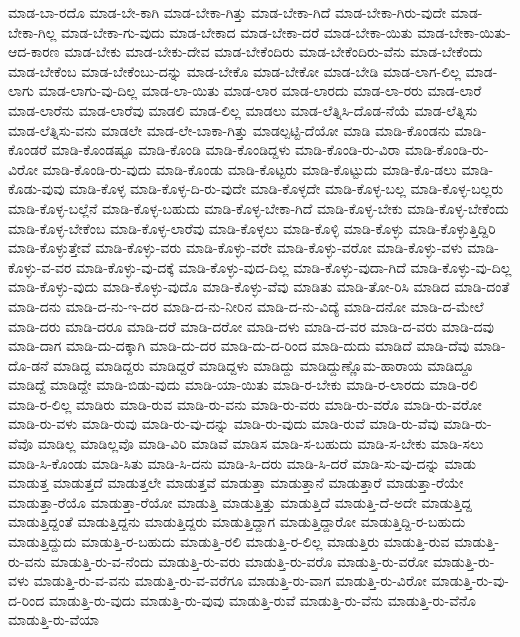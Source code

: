{ಮಾಡ-ಬಾ-ರದೊ
ಮಾಡ-ಬೇ-ಕಾಗಿ
ಮಾಡ-ಬೇಕಾ-ಗಿತ್ತು
ಮಾಡ-ಬೇಕಾ-ಗಿದೆ
ಮಾಡ-ಬೇಕಾ-ಗಿರು-ವುದೇ
ಮಾಡ-ಬೇಕಾ-ಗಿಲ್ಲ
ಮಾಡ-ಬೇಕಾ-ಗು-ವುದು
ಮಾಡ-ಬೇಕಾದ
ಮಾಡ-ಬೇಕಾ-ದರೆ
ಮಾಡ-ಬೇಕಾ-ಯಿತು
ಮಾಡ-ಬೇಕಾ-ಯಿತು-ಆದ-ಕಾರಣ
ಮಾಡ-ಬೇಕು
ಮಾಡ-ಬೇಕು-ದೇವ
ಮಾಡ-ಬೇಕೆಂದಿರು
ಮಾಡ-ಬೇಕೆಂದಿರು-ವೆನು
ಮಾಡ-ಬೇಕೆಂದು
ಮಾಡ-ಬೇಕೆಂಬ
ಮಾಡ-ಬೇಕೆಂಬು-ದನ್ನು
ಮಾಡ-ಬೇಕೊ
ಮಾಡ-ಬೇಕೋ
ಮಾಡ-ಬೇಡಿ
ಮಾಡ-ಲಾಗ-ಲಿಲ್ಲ
ಮಾಡ-ಲಾಗು
ಮಾಡ-ಲಾಗು-ವು-ದಿಲ್ಲ
ಮಾಡ-ಲಾ-ಯಿತು
ಮಾಡ-ಲಾರ
ಮಾಡ-ಲಾರದು
ಮಾಡ-ಲಾ-ರರು
ಮಾಡ-ಲಾರೆ
ಮಾಡ-ಲಾರೆನು
ಮಾಡ-ಲಾರೆವು
ಮಾಡಲಿ
ಮಾಡ-ಲಿಲ್ಲ
ಮಾಡಲು
ಮಾಡ-ಲೆತ್ನಿಸಿ-ದೊಡ-ನೆಯೆ
ಮಾಡ-ಲೆತ್ನಿಸು
ಮಾಡ-ಲೆತ್ನಿಸು-ವನು
ಮಾಡಲೇ
ಮಾಡ-ಲೇ-ಬಾಕಾ-ಗಿತ್ತು
ಮಾಡಲ್ಪಟ್ಟಿ-ದೆಯೋ
ಮಾಡಿ
ಮಾಡಿ-ಕೊಂಡನು
ಮಾಡಿ-ಕೊಂಡರೆ
ಮಾಡಿ-ಕೊಂಡಷ್ಟೂ
ಮಾಡಿ-ಕೊಂಡಿ
ಮಾಡಿ-ಕೊಂಡಿದ್ದಳು
ಮಾಡಿ-ಕೊಂಡಿ-ರು-ವಿರಾ
ಮಾಡಿ-ಕೊಂಡಿ-ರು-ವಿರೋ
ಮಾಡಿ-ಕೊಂಡಿ-ರು-ವುದು
ಮಾಡಿ-ಕೊಂಡು
ಮಾಡಿ-ಕೊಟ್ಟರು
ಮಾಡಿ-ಕೊಟ್ಟುದು
ಮಾಡಿ-ಕೊ-ಡಲು
ಮಾಡಿ-ಕೊಡು-ವುವು
ಮಾಡಿ-ಕೊಳ್ಳ
ಮಾಡಿ-ಕೊಳ್ಳ-ದಿ-ರು-ವುದೇ
ಮಾಡಿ-ಕೊಳ್ಳದೇ
ಮಾಡಿ-ಕೊಳ್ಳ-ಬಲ್ಲ
ಮಾಡಿ-ಕೊಳ್ಳ-ಬಲ್ಲರು
ಮಾಡಿ-ಕೊಳ್ಳ-ಬಲ್ಲೆನೆ
ಮಾಡಿ-ಕೊಳ್ಳ-ಬಹುದು
ಮಾಡಿ-ಕೊಳ್ಳ-ಬೇಕಾ-ಗಿದೆ
ಮಾಡಿ-ಕೊಳ್ಳ-ಬೇಕು
ಮಾಡಿ-ಕೊಳ್ಳ-ಬೇಕೆಂದು
ಮಾಡಿ-ಕೊಳ್ಳ-ಬೇಕೆಂಬ
ಮಾಡಿ-ಕೊಳ್ಳ-ಲಾರೆವು
ಮಾಡಿ-ಕೊಳ್ಳಲು
ಮಾಡಿ-ಕೊಳ್ಳಿ
ಮಾಡಿ-ಕೊಳ್ಳು
ಮಾಡಿ-ಕೊಳ್ಳುತ್ತಿದ್ದಿರಿ
ಮಾಡಿ-ಕೊಳ್ಳುತ್ತೇವೆ
ಮಾಡಿ-ಕೊಳ್ಳು-ವರು
ಮಾಡಿ-ಕೊಳ್ಳು-ವರೇ
ಮಾಡಿ-ಕೊಳ್ಳು-ವರೋ
ಮಾಡಿ-ಕೊಳ್ಳು-ವಳು
ಮಾಡಿ-ಕೊಳ್ಳು-ವ-ವರ
ಮಾಡಿ-ಕೊಳ್ಳು-ವು-ದಕ್ಕೆ
ಮಾಡಿ-ಕೊಳ್ಳು-ವುದ-ದಿಲ್ಲ
ಮಾಡಿ-ಕೊಳ್ಳು-ವುದಾ-ಗಿದೆ
ಮಾಡಿ-ಕೊಳ್ಳು-ವು-ದಿಲ್ಲ
ಮಾಡಿ-ಕೊಳ್ಳು-ವುದು
ಮಾಡಿ-ಕೊಳ್ಳು-ವುದೊ
ಮಾಡಿ-ಕೊಳ್ಳು-ವೆವು
ಮಾಡಿತು
ಮಾಡಿ-ತೋ-ರಿಸಿ
ಮಾಡಿದ
ಮಾಡಿ-ದಂತೆ
ಮಾಡಿ-ದನು
ಮಾಡಿ-ದ-ನು-ಇ-ದರ
ಮಾಡಿ-ದ-ನು-ನೀರಿನ
ಮಾಡಿ-ದ-ನು-ವಿದ್ಯೆ
ಮಾಡಿ-ದನೋ
ಮಾಡಿ-ದ-ಮೇಲೆ
ಮಾಡಿ-ದರು
ಮಾಡಿ-ದರೂ
ಮಾಡಿ-ದರೆ
ಮಾಡಿ-ದರೋ
ಮಾಡಿ-ದಳು
ಮಾಡಿ-ದ-ವರ
ಮಾಡಿ-ದ-ವರು
ಮಾಡಿ-ದವು
ಮಾಡಿ-ದಾಗ
ಮಾಡಿ-ದು-ದಕ್ಕಾಗಿ
ಮಾಡಿ-ದು-ದರ
ಮಾಡಿ-ದು-ದ-ರಿಂದ
ಮಾಡಿ-ದುದು
ಮಾಡಿದೆ
ಮಾಡಿ-ದೆವು
ಮಾಡಿ-ದೊ-ಡನೆ
ಮಾಡಿದ್ದ
ಮಾಡಿದ್ದರು
ಮಾಡಿದ್ದರೆ
ಮಾಡಿದ್ದಳು
ಮಾಡಿದ್ದು
ಮಾಡಿದ್ದುಣ್ಣೊಮ-ಹಾರಾಯ
ಮಾಡಿದ್ದೂ
ಮಾಡಿದ್ದೆ
ಮಾಡಿದ್ದೇ
ಮಾಡಿ-ಬಿಡು-ವುದು
ಮಾಡಿ-ಯಾ-ಯಿತು
ಮಾಡಿ-ರ-ಬೇಕು
ಮಾಡಿ-ರ-ಲಾರದು
ಮಾಡಿ-ರಲಿ
ಮಾಡಿ-ರ-ಲಿಲ್ಲ
ಮಾಡಿರು
ಮಾಡಿ-ರುವ
ಮಾಡಿ-ರು-ವನು
ಮಾಡಿ-ರು-ವರು
ಮಾಡಿ-ರು-ವರೊ
ಮಾಡಿ-ರು-ವರೋ
ಮಾಡಿ-ರು-ವಳು
ಮಾಡಿ-ರುವು
ಮಾಡಿ-ರು-ವು-ದನ್ನು
ಮಾಡಿ-ರು-ವುದು
ಮಾಡಿ-ರುವೆ
ಮಾಡಿ-ರು-ವೆವು
ಮಾಡಿ-ರು-ವೆವೊ
ಮಾಡಿಲ್ಲ
ಮಾಡಿಲ್ಲವೊ
ಮಾಡಿ-ವಿರಿ
ಮಾಡಿವೆ
ಮಾಡಿಸ
ಮಾಡಿ-ಸ-ಬಹುದು
ಮಾಡಿ-ಸ-ಬೇಕು
ಮಾಡಿ-ಸಲು
ಮಾಡಿ-ಸಿ-ಕೊಂಡು
ಮಾಡಿ-ಸಿತು
ಮಾಡಿ-ಸಿ-ದನು
ಮಾಡಿ-ಸಿ-ದರು
ಮಾಡಿ-ಸಿ-ದರೆ
ಮಾಡಿ-ಸು-ವು-ದನ್ನು
ಮಾಡು
ಮಾಡುತ್ತ
ಮಾಡುತ್ತದೆ
ಮಾಡುತ್ತಲೇ
ಮಾಡುತ್ತವೆ
ಮಾಡುತ್ತಾ
ಮಾಡುತ್ತಾನೆ
ಮಾಡುತ್ತಾರೆ
ಮಾಡುತ್ತಾ-ರೆಯೇ
ಮಾಡುತ್ತಾ-ರೆಯೊ
ಮಾಡುತ್ತಾ-ರೆಯೋ
ಮಾಡುತ್ತಿ
ಮಾಡುತ್ತಿತ್ತು
ಮಾಡುತ್ತಿದೆ
ಮಾಡುತ್ತಿ-ದೆ-ಅದೇ
ಮಾಡುತ್ತಿದ್ದ
ಮಾಡುತ್ತಿದ್ದಂತೆ
ಮಾಡುತ್ತಿದ್ದನು
ಮಾಡುತ್ತಿದ್ದರು
ಮಾಡುತ್ತಿದ್ದಾಗ
ಮಾಡುತ್ತಿದ್ದಾರೋ
ಮಾಡುತ್ತಿದ್ದಿ-ರ-ಬಹುದು
ಮಾಡುತ್ತಿದ್ದುದು
ಮಾಡುತ್ತಿ-ರ-ಬಹುದು
ಮಾಡುತ್ತಿ-ರಲಿ
ಮಾಡುತ್ತಿ-ರ-ಲಿಲ್ಲ
ಮಾಡುತ್ತಿರು
ಮಾಡುತ್ತಿ-ರುವ
ಮಾಡುತ್ತಿ-ರು-ವನು
ಮಾಡುತ್ತಿ-ರು-ವ-ನೆಂದು
ಮಾಡುತ್ತಿ-ರು-ವರು
ಮಾಡುತ್ತಿ-ರು-ವರೊ
ಮಾಡುತ್ತಿ-ರು-ವರೋ
ಮಾಡುತ್ತಿ-ರು-ವಳು
ಮಾಡುತ್ತಿ-ರು-ವ-ವನು
ಮಾಡುತ್ತಿ-ರು-ವ-ವರೆಗೂ
ಮಾಡುತ್ತಿ-ರು-ವಾಗ
ಮಾಡುತ್ತಿ-ರು-ವಿರೋ
ಮಾಡುತ್ತಿ-ರು-ವು-ದ-ರಿಂದ
ಮಾಡುತ್ತಿ-ರು-ವುದು
ಮಾಡುತ್ತಿ-ರು-ವುವು
ಮಾಡುತ್ತಿ-ರುವೆ
ಮಾಡುತ್ತಿ-ರು-ವೆನು
ಮಾಡುತ್ತಿ-ರು-ವೆನೊ
ಮಾಡುತ್ತಿ-ರು-ವೆಯಾ
}

